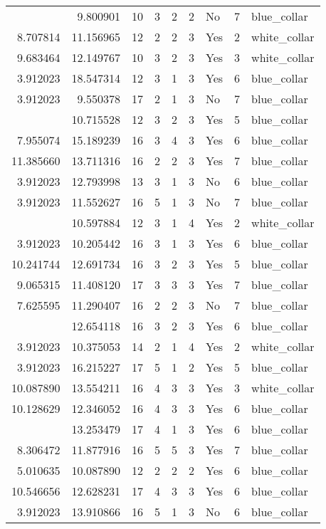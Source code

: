 \documentclass[
]{article}
\begin{document}
\begin{longtable}[t]{rrrrrllrl}
\addlinespace
8.902456 & 9.800901 & 10 & 3 & 2 & 2 & No & 7 & blue\_collar\\
8.707814 & 11.156965 & 12 & 2 & 2 & 3 & Yes & 2 & white\_collar\\
9.683464 & 12.149767 & 10 & 3 & 2 & 3 & Yes & 3 & white\_collar\\
3.912023 & 18.547314 & 12 & 3 & 1 & 3 & Yes & 6 & blue\_collar\\
3.912023 & 9.550378 & 17 & 2 & 1 & 3 & No & 7 & blue\_collar\\
\addlinespace
4.382027 & 10.715528 & 12 & 3 & 2 & 3 & Yes & 5 & blue\_collar\\
7.955074 & 15.189239 & 16 & 3 & 4 & 3 & Yes & 6 & blue\_collar\\
11.385660 & 13.711316 & 16 & 2 & 2 & 3 & Yes & 7 & blue\_collar\\
3.912023 & 12.793998 & 13 & 3 & 1 & 3 & No & 6 & blue\_collar\\
3.912023 & 11.552627 & 16 & 5 & 1 & 3 & No & 7 & blue\_collar\\
\addlinespace
3.912023 & 10.597884 & 12 & 3 & 1 & 4 & Yes & 2 & white\_collar\\
3.912023 & 10.205442 & 16 & 3 & 1 & 3 & Yes & 6 & blue\_collar\\
10.241744 & 12.691734 & 16 & 3 & 2 & 3 & Yes & 5 & blue\_collar\\
9.065315 & 11.408120 & 17 & 3 & 3 & 3 & Yes & 7 & blue\_collar\\
7.625595 & 11.290407 & 16 & 2 & 2 & 3 & No & 7 & blue\_collar\\
\addlinespace
9.905984 & 12.654118 & 16 & 3 & 2 & 3 & Yes & 6 & blue\_collar\\
3.912023 & 10.375053 & 14 & 2 & 1 & 4 & Yes & 2 & white\_collar\\
3.912023 & 16.215227 & 17 & 5 & 1 & 2 & Yes & 5 & blue\_collar\\
10.087890 & 13.554211 & 16 & 4 & 3 & 3 & Yes & 3 & white\_collar\\
10.128629 & 12.346052 & 16 & 4 & 3 & 3 & Yes & 6 & blue\_collar\\
\addlinespace
3.912023 & 13.253479 & 17 & 4 & 1 & 3 & Yes & 6 & blue\_collar\\
8.306472 & 11.877916 & 16 & 5 & 5 & 3 & Yes & 7 & blue\_collar\\
5.010635 & 10.087890 & 12 & 2 & 2 & 2 & Yes & 6 & blue\_collar\\
10.546656 & 12.628231 & 17 & 4 & 3 & 3 & Yes & 6 & blue\_collar\\
3.912023 & 13.910866 & 16 & 5 & 1 & 3 & No & 6 & blue\_collar\\

\end{longtable}
\end{document}

